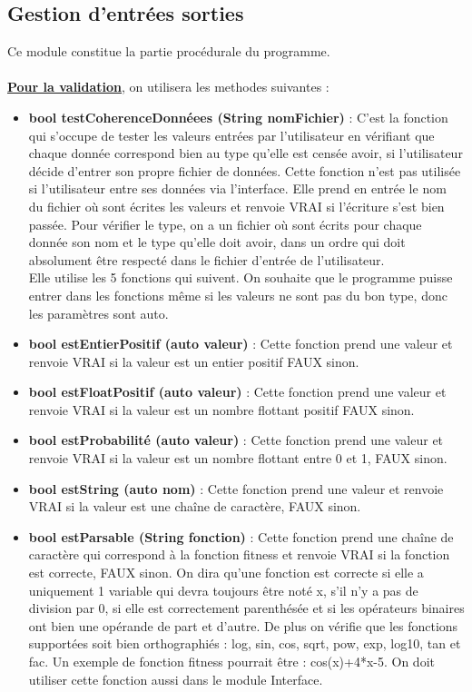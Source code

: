 \documentclass[a4paper,11pt]{article}
\begin{document}
		\subsection{Gestion d'entrées sorties}
			Ce module constitue la partie procédurale du programme.\\
			\\
			\underline{\bf Pour la validation}, on utilisera les methodes suivantes :\\
			\begin{itemize}
				\item \textbf{bool testCoherenceDonnéees (String nomFichier)} : C’est la fonction qui s’occupe de tester les valeurs entrées par l’utilisateur en vérifiant que chaque donnée correspond bien au type qu’elle est censée avoir, si l'utilisateur décide d'entrer son propre fichier de données. Cette fonction n'est pas utilisée si l'utilisateur entre ses données via l'interface.
					Elle prend en entrée le nom du fichier où sont écrites les valeurs et renvoie VRAI si l'écriture s'est bien passée.
					Pour vérifier le type, on a un fichier où sont écrits pour chaque donnée son nom et le type qu’elle doit avoir, dans un ordre qui doit absolument être respecté dans le fichier d'entrée de l'utilisateur.\\
					Elle utilise les 5 fonctions qui suivent. On souhaite que le programme puisse entrer dans les fonctions même si les valeurs ne sont pas du bon type, donc les paramètres sont auto.\vspace{0.2cm}
				\item \textbf{bool estEntierPositif (auto valeur)} : Cette fonction prend une valeur et renvoie VRAI si la valeur est un entier positif FAUX sinon.\vspace{0.2cm}
				\item \textbf{bool estFloatPositif (auto valeur)} : Cette fonction prend une valeur et renvoie VRAI si la valeur est un nombre flottant positif FAUX sinon.\vspace{0.2cm}
				\item \textbf{bool estProbabilité (auto valeur)} : Cette fonction prend une valeur et renvoie VRAI si la valeur est un nombre flottant entre 0 et 1, FAUX sinon.\vspace{0.2cm}
				\item \textbf{bool estString (auto nom)} : 	Cette fonction prend une valeur et renvoie VRAI si la valeur est une chaîne de caractère, FAUX sinon.\vspace{0.2cm}
				\item \textbf{bool estParsable (String fonction)} : Cette fonction prend une chaîne de caractère qui correspond à la fonction fitness et renvoie VRAI si la fonction est correcte, FAUX sinon. On dira qu’une fonction est correcte si elle a uniquement 1 variable qui devra toujours être noté x, s’il n’y a pas de division par 0, si elle est correctement parenthésée et si les opérateurs binaires ont bien une opérande de part et d’autre. De plus on vérifie que les fonctions supportées soit bien orthographiés : log, sin, cos, sqrt, pow, exp, log10, tan et fac.  Un exemple de fonction fitness pourrait être : cos(x)+4*x-5. On doit utiliser cette fonction aussi dans le module Interface.\\

\end{itemize}
\end{document}
